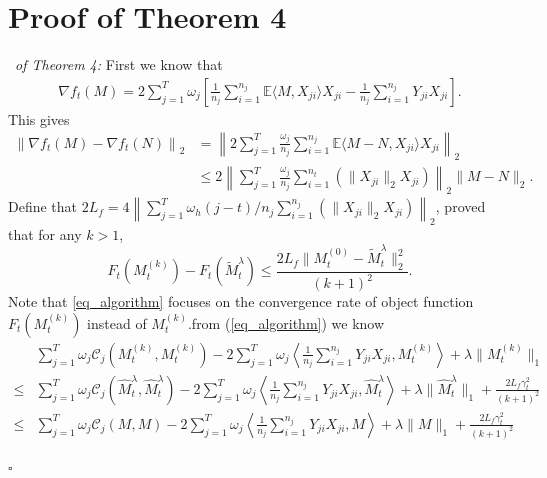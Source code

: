 \documentclass[12pt]{article}
\newenvironment{pf}{{\noindent\it Proof}\ }{\hfill $\square$\par}
\begin{document}
\section{Proof of Theorem 4}
\begin{pf}{\it of Theorem 4:}
  First we know that \begin{align*}
      \nabla f_t(M) = 2\sum_{j=1}^T \omega_j \left[\frac{1}{n_j}\sum_{i=1}^{n_j}\mathbb{E} \langle M,X_{ji}\rangle X_{ji}  - \frac{1}{n_j}\sum_{i=1}^{n_j}Y_{ji}X_{ji}\right].
  \end{align*}
  This gives
  \begin{align*}
      \left\|\nabla f_t(M) - \nabla f_t(N)\right\|_2 &= \left\|2\sum_{j=1}^T \frac{\omega_j}{n_j}\sum_{i=1}^{n_j} \mathbb{E}\langle M - N,X_{ji}\rangle X_{ji}\right\|_2
      \\&\le 2\left\|\sum_{j=1}^T \frac{\omega_j}{n_j}\sum_{i=1}^{n_t} \left(\|X_{ji}\|_2X_{ji}\right)\right\|_2\|M-N\|_2.
  \end{align*}
  Define that $2L_f = 4\left\|\sum_{j=1}^T \omega_h(j-t)/n_j\sum_{i=1}^{n_j} \left(\|X_{ji}\|_2X_{ji}\right)\right\|_2$,
  \cite{toh2010accelerated} proved that for any $k>1$,
  \begin{equation}
  \label{eq_algorithm}
  F_t(M_t^{(k)}) - F_t(\widetilde{M}_t^\lambda) \le \frac{2 L_f\|M_t^{(0)} - \widetilde{M}_t^\lambda\|_2^2}{(k+1)^2}.
  \end{equation}
  Note that \eqref{eq_algorithm} focuses on the convergence rate of object function $ F_t(M_t^{(k)})$ instead of $M_t^{(k)}$.from (\ref{eq_algorithm}) we know 
  \begin{equation*}
  \begin{aligned}
  & \sum_{j=1}^T \omega_j \mathcal{C}_j(M_t^{(k)},M_t^{(k)}) -2 \sum_{j=1}^T \omega_j \left\langle \frac{1}{n_j}\sum_{i=1}^{n_j} Y_{j i}X_{j i},M^{(k)}_{t} \right\rangle + \lambda \|M^{(k)}_{t} \|_1\\
  \le &
  \sum_{j=1}^T \omega_j \mathcal{C}_j(\widehat{M}_t^{\lambda},\widehat{M}_t^{\lambda})-2 \sum_{j=1}^T \omega_j \left\langle \frac{1}{n_j}\sum_{i=1}^{n_j} Y_{j i}X_{j i}, \widehat{M}_t^{\lambda} \right\rangle + \lambda \|\widehat{M}_t^{\lambda}\|_1 + \frac{2L_f\gamma_t^2}{(k+1)^2}
  \\\le & 
  \sum_{j=1}^T \omega_j \mathcal{C}_j(M,M) -2 \sum_{j=1}^T \omega_j \left\langle \frac{1}{n_j}\sum_{i=1}^{n_j} Y_{j i}X_{j i}, M\right\rangle + \lambda \|M\|_1 + \frac{2L_f\gamma_t^2}{(k+1)^2}
  \end{aligned}
  \end{equation*}

\end{pf}
\end{document}
